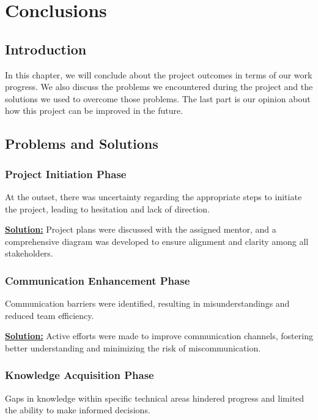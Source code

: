 \chapter{Conclusions}


\section{Introduction}
In this chapter, we will conclude about the project outcomes in terms of our work progress. We also discuss the problems we encountered during the project and the solutions we used to overcome those problems. The last part is our opinion about how this project can be improved in the future.
\section{Problems and Solutions}
\subsection{Project Initiation Phase} At the outset, there was uncertainty regarding the appropriate steps to initiate the project, leading to hesitation and lack of direction.

\underline{\textbf{Solution:}} Project plans were discussed with the assigned mentor, and a comprehensive diagram was developed to ensure alignment and clarity among all stakeholders.

\subsection{Communication Enhancement Phase} Communication barriers were identified, resulting in misunderstandings and reduced team efficiency.

\underline{\textbf{Solution:}} Active efforts were made to improve communication channels, fostering better understanding and minimizing the risk of miscommunication.

\subsection{Knowledge Acquisition Phase} Gaps in knowledge within specific technical areas hindered progress and limited the ability to make informed decisions.

